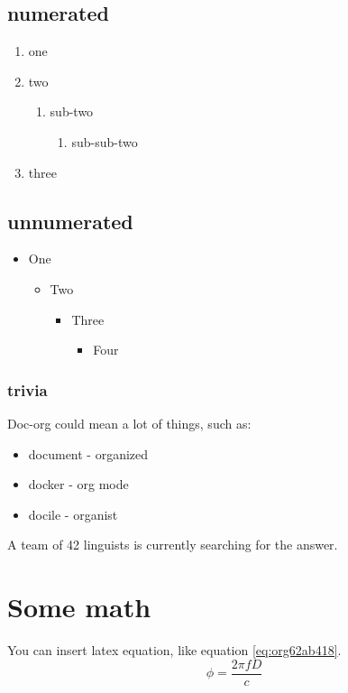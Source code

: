\subsection{numerated}
\label{sec:orgb5f303c}
\begin{enumerate}
\item one
\item two
\begin{enumerate}
\item sub-two
\begin{enumerate}
\item sub-sub-two
\end{enumerate}
\end{enumerate}
\item three
\end{enumerate}

\subsection{unnumerated}
\label{sec:orgcf4fb78}
\begin{itemize}
\item One
\begin{itemize}
\item Two
\begin{itemize}
\item Three
\begin{itemize}
\item Four
\end{itemize}
\end{itemize}
\end{itemize}
\end{itemize}

\subsubsection{trivia}
\label{sec:org0a7d261}
Doc-org could mean a lot of things, such as:
\begin{itemize}
\item document - organized
\item docker - org mode
\item docile - organist
\end{itemize}
A team of 42 linguists is currently searching for the answer.

\section{Some math}
\label{sec:org35216f3}
You can insert latex equation, like equation \ref{eq:org62ab418}.
\begin{equation}
\label{eq:org62ab418}
\phi = \frac{2\pi fD}{c}
\end{equation}

